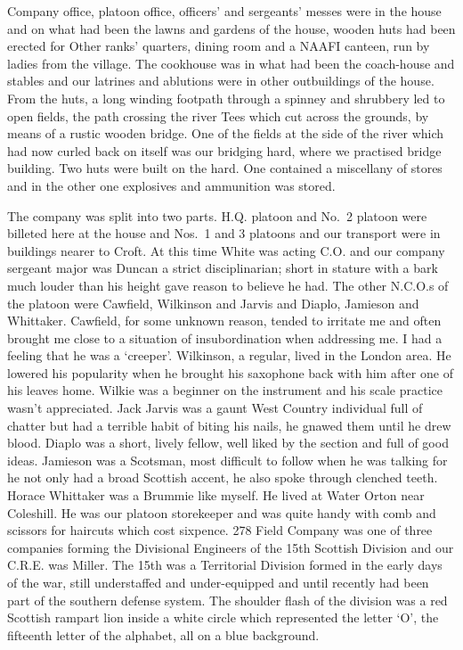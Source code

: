 Company office, platoon office, officers' and sergeants' messes were
in the house and on what had been the lawns and gardens of the house,
wooden huts had been erected for Other ranks' quarters, dining room
and a NAAFI canteen, run by ladies from the village. The cookhouse
was in what had been the coach-house and stables and our latrines and
ablutions were in other outbuildings of the house. From the huts, a
long winding footpath through a spinney and shrubbery led to open
fields, the path crossing the river Tees which cut across the grounds,
by means of a rustic wooden bridge. One of the fields at the side of
the river which had now curled back on itself was our bridging hard,
where we practised bridge building. Two huts were built on the hard.
One contained a miscellany of stores and in the other one explosives
and ammunition was stored.

The company was split into two parts. H.Q. platoon and No.~2 platoon
were billeted here at the house and Nos.~1 and 3 platoons and our
transport were in buildings nearer to Croft. At this time \captain
White was acting C.O. and our company sergeant major was \sergeantM
Duncan a strict disciplinarian; short in stature with a bark much
louder than his height gave reason to believe he had. The other
N.C.O.s of the platoon were \lsergeant Cawfield, \corporals Wilkinson
and Jarvis and \lcorporals Diaplo, Jamieson and Whittaker. \Lsergeant
Cawfield, for some unknown reason, tended to irritate me and often
brought me close to a situation of insubordination when addressing me.
I had a feeling that he was a `creeper'. \Corporal Wilkinson, a
regular, lived in the London area. He lowered his popularity when he
brought his saxophone back with him after one of his leaves home.
Wilkie was a beginner on the instrument and his scale practice wasn't
appreciated. \Corporal Jack Jarvis was a gaunt West Country individual
full of chatter but had a terrible habit of biting his nails, he
gnawed them until he drew blood. \Lcorporal Diaplo was a short, lively
fellow, well liked by the section and full of good ideas.  Jamieson
was a Scotsman, most difficult to follow when he was talking for he
not only had a broad Scottish accent, he also spoke through clenched
teeth. Horace Whittaker was a Brummie like myself.  He lived at Water
Orton near Coleshill. He was our platoon storekeeper and was quite
handy with comb and scissors for haircuts which cost sixpence. 278
Field Company was one of three companies forming the Divisional
Engineers of the 15th Scottish Division and our C.R.E. was \lcolonel
Miller. The 15th was a Territorial Division formed in the early days
of the war, still understaffed and under-equipped and until recently
had been part of the southern defense system. The shoulder flash of
the division was a red Scottish rampart lion inside a white circle
which represented the letter `O', the fifteenth letter of the
alphabet, all on a blue background.

